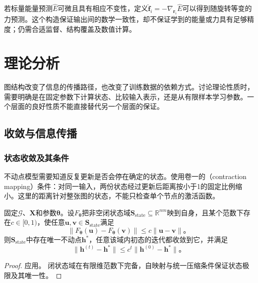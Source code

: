 若标量能量预测$\widehat E$可微且具有相应不变性，定义$\widehat{\bm{f}}_i=-\nabla_{\bm{r}_i}\widehat E$可以得到随旋转等变的力预测。这个构造保证输出间的数学一致性，却不保证学到的能量或力具有足够精度；仍需合适监督、结构覆盖及数值计算。

\section{理论分析}
\label{sec:gnn-theory}

图结构改变了信息的传播路径，也改变了训练数据的依赖方式。讨论理论性质时，需要明确是在固定参数下计算状态、比较输入表示，还是从有限样本学习参数。一个层面的良好性质不能直接替代另一个层面的保证。

\subsection{收敛与信息传播}
\label{sec:gnn-propagation-theory}

\subsubsection{状态收敛及其条件}
\label{sec:gnn-state-convergence}

不动点模型需要知道反复更新是否会停在确定的状态。使用卷一的（contraction mapping）条件：对同一输入，两份状态经过更新后距离按小于1的固定比例缩小。这里的距离针对整张图的状态，不能只检查单个节点的激活函数。

\begin{theorem}[压缩更新的唯一不动点]
\label{thm:gnn-contraction}
固定$\mathcal{G}$、$\bm{X}$和参数$\bm{\theta}$。设$F_{\bm{\theta}}$把非空闭状态域$\bm{S}_{\mathrm{state}}\subseteq\mathbb{R}^{nm}$映到自身，且某个范数下存在$c\in[0,1)$，使任意$\bm{u},\bm{v}\in\bm{S}_{\mathrm{state}}$满足
\[
  \lVert F_{\bm{\theta}}(\bm{u})-F_{\bm{\theta}}(\bm{v})\rVert
    \leq c\lVert\bm{u}-\bm{v}\rVert\text{。}
\]
则$\bm{S}_{\mathrm{state}}$中存在唯一不动点$\bm{h}^*$，任意该域内初态的迭代都收敛到它，并满足
\begin{equation}
  \lVert\bm{h}^{(t)}-\bm{h}^*\rVert
    \leq c^t\lVert\bm{h}^{(0)}-\bm{h}^*\rVert\text{。}
  \label{eq:gnn-contraction-error}
\end{equation}
\end{theorem}
\begin{proof}
应用。
闭状态域在有限维范数下完备，自映射与统一压缩条件保证状态极限及其唯一性。
\end{proof}

